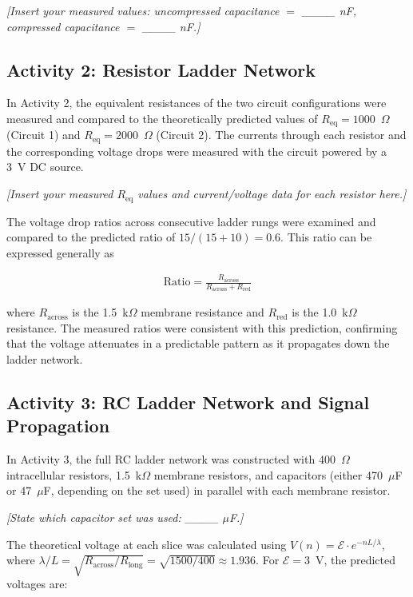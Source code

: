 \message{ !name(lab_report.tex)}\documentclass[12pt]{article}
\begin{document}
\textit{[Insert your measured values: uncompressed capacitance $= $ \_\_\_\_ nF, compressed capacitance $= $ \_\_\_\_ nF.]}

\subsection{Activity 2: Resistor Ladder Network}

In Activity 2, the equivalent resistances of the two circuit configurations were measured and compared to the theoretically predicted values of $R_{\text{eq}} = 1000$~$\Omega$ (Circuit 1) and $R_{\text{eq}} = 2000$~$\Omega$ (Circuit 2). The currents through each resistor and the corresponding voltage drops were measured with the circuit powered by a 3~V DC source.

\textit{[Insert your measured $R_{\text{eq}}$ values and current/voltage data for each resistor here.]}

The voltage drop ratios across consecutive ladder rungs were examined and compared to the predicted ratio of $15/(15+10) = 0.6$. This ratio can be expressed generally as

\begin{align*}
    \text{Ratio} = \frac{R_{\text{across}}}{R_{\text{across}} + R_{\text{red}}}
\end{align*}

where $R_{\text{across}}$ is the 1.5~k$\Omega$ membrane resistance and $R_{\text{red}}$ is the 1.0~k$\Omega$ resistance. The measured ratios were consistent with this prediction, confirming that the voltage attenuates in a predictable pattern as it propagates down the ladder network.

\subsection{Activity 3: RC Ladder Network and Signal Propagation}

In Activity 3, the full RC ladder network was constructed with 400~$\Omega$ intracellular resistors, 1.5~k$\Omega$ membrane resistors, and capacitors (either 470~$\mu$F or 47~$\mu$F, depending on the set used) in parallel with each membrane resistor.

\textit{[State which capacitor set was used: \_\_\_\_ $\mu$F.]}

The theoretical voltage at each slice was calculated using $V(n) = \mathcal{E} \cdot e^{-nL/\lambda}$, where $\lambda/L = \sqrt{R_{\text{across}}/R_{\text{long}}} = \sqrt{1500/400} \approx 1.936$. For $\mathcal{E} = 3$~V, the predicted voltages are:
\end{document}

